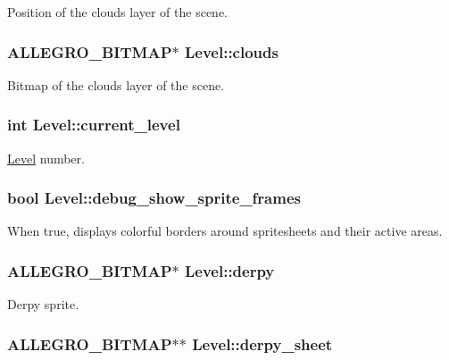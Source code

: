 \-Position of the clouds layer of the scene. \hypertarget{structLevel_a27d34b57b66d4e7f733cb6a5cc16ff18}{
\subsubsection[{clouds}]{\setlength{\rightskip}{0pt plus 5cm}\-A\-L\-L\-E\-G\-R\-O\-\_\-\-B\-I\-T\-M\-A\-P$\ast$ {\bf \-Level\-::clouds}}}\label{structLevel_a27d34b57b66d4e7f733cb6a5cc16ff18}
\-Bitmap of the clouds layer of the scene. \hypertarget{structLevel_a1ba3ee0104c912dde5d6e70fee889512}{
\subsubsection[{current\-\_\-level}]{\setlength{\rightskip}{0pt plus 5cm}int {\bf \-Level\-::current\-\_\-level}}}\label{structLevel_a1ba3ee0104c912dde5d6e70fee889512}
\hyperlink{structLevel}{\-Level} number. \hypertarget{structLevel_a1df786b74cff642434ea6587e6141b4d}{
\subsubsection[{debug\-\_\-show\-\_\-sprite\-\_\-frames}]{\setlength{\rightskip}{0pt plus 5cm}bool {\bf \-Level\-::debug\-\_\-show\-\_\-sprite\-\_\-frames}}}\label{structLevel_a1df786b74cff642434ea6587e6141b4d}
\-When true, displays colorful borders around spritesheets and their active areas. \hypertarget{structLevel_ae33832497116b7a0c184959bbde21ee5}{
\subsubsection[{derpy}]{\setlength{\rightskip}{0pt plus 5cm}\-A\-L\-L\-E\-G\-R\-O\-\_\-\-B\-I\-T\-M\-A\-P$\ast$ {\bf \-Level\-::derpy}}}\label{structLevel_ae33832497116b7a0c184959bbde21ee5}
\-Derpy sprite. \hypertarget{structLevel_a0e02f3a5674a2ad3c23de22b6a4ed044}{
\subsubsection[{derpy\-\_\-sheet}]{\setlength{\rightskip}{0pt plus 5cm}\-A\-L\-L\-E\-G\-R\-O\-\_\-\-B\-I\-T\-M\-A\-P$\ast$$\ast$ {\bf \-Level\-::derpy\-\_\-sheet}}}\label{structLevel_a0e02f3a5674a2ad3c23de22b6a4ed044}
